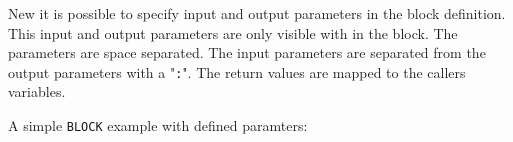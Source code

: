 New it is possible to specify input and output parameters in the block
definition. This input and output parameters are only visible with in the block.
The parameters are space separated. The input parameters are separated from 
the output parameters with a "\texttt{:}". The return values are mapped
to the callers variables.

A simple \texttt{BLOCK} example with defined paramters:


